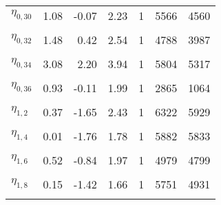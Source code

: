 \begin{table}
\begin{tabular}[t]{lrrrrrr}
$\eta_{0, 30}$ & 1.08 & -0.07 & 2.23 & 1 & 5566 & 4560\\
\cellcolor{gray!6}{$\eta_{0, 31}$} & \cellcolor{gray!6}{2.32} & \cellcolor{gray!6}{1.16} & \cellcolor{gray!6}{3.48} & \cellcolor{gray!6}{1} & \cellcolor{gray!6}{4941} & \cellcolor{gray!6}{2898}\\
$\eta_{0, 32}$ & 1.48 & 0.42 & 2.54 & 1 & 4788 & 3987\\
\cellcolor{gray!6}{$\eta_{0, 33}$} & \cellcolor{gray!6}{3.94} & \cellcolor{gray!6}{2.66} & \cellcolor{gray!6}{5.18} & \cellcolor{gray!6}{1} & \cellcolor{gray!6}{5681} & \cellcolor{gray!6}{6354}\\
$\eta_{0, 34}$ & 3.08 & 2.20 & 3.94 & 1 & 5804 & 5317\\
\cellcolor{gray!6}{$\eta_{0, 35}$} & \cellcolor{gray!6}{1.53} & \cellcolor{gray!6}{0.44} & \cellcolor{gray!6}{2.63} & \cellcolor{gray!6}{1} & \cellcolor{gray!6}{5048} & \cellcolor{gray!6}{5067}\\
$\eta_{0, 36}$ & 0.93 & -0.11 & 1.99 & 1 & 2865 & 1064\\
\cellcolor{gray!6}{$\eta_{1, 1}$} & \cellcolor{gray!6}{0.44} & \cellcolor{gray!6}{-1.10} & \cellcolor{gray!6}{1.96} & \cellcolor{gray!6}{1} & \cellcolor{gray!6}{5210} & \cellcolor{gray!6}{4653}\\
$\eta_{1, 2}$ & 0.37 & -1.65 & 2.43 & 1 & 6322 & 5929\\
\cellcolor{gray!6}{$\eta_{1, 3}$} & \cellcolor{gray!6}{2.17} & \cellcolor{gray!6}{0.48} & \cellcolor{gray!6}{3.90} & \cellcolor{gray!6}{1} & \cellcolor{gray!6}{5445} & \cellcolor{gray!6}{5201}\\
$\eta_{1, 4}$ & 0.01 & -1.76 & 1.78 & 1 & 5882 & 5833\\
\cellcolor{gray!6}{$\eta_{1, 5}$} & \cellcolor{gray!6}{-0.72} & \cellcolor{gray!6}{-2.69} & \cellcolor{gray!6}{1.14} & \cellcolor{gray!6}{1} & \cellcolor{gray!6}{5426} & \cellcolor{gray!6}{3760}\\
$\eta_{1, 6}$ & 0.52 & -0.84 & 1.97 & 1 & 4979 & 4799\\
\cellcolor{gray!6}{$\eta_{1, 7}$} & \cellcolor{gray!6}{2.55} & \cellcolor{gray!6}{0.13} & \cellcolor{gray!6}{5.22} & \cellcolor{gray!6}{1} & \cellcolor{gray!6}{5667} & \cellcolor{gray!6}{5443}\\
$\eta_{1, 8}$ & 0.15 & -1.42 & 1.66 & 1 & 5751 & 4931\\
\cellcolor{gray!6}{$\eta_{1, 9}$} & \cellcolor{gray!6}{-0.47} & \cellcolor{gray!6}{-3.15} & \cellcolor{gray!6}{1.92} & \cellcolor{gray!6}{1} & \cellcolor{gray!6}{4592} & \cellcolor{gray!6}{4873}\\

\end{tabular}
\end{table}
